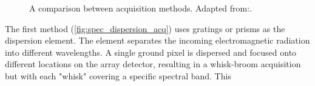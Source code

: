 \begin{figure}[htb!]
    \centering
    \captionsetup[subfigure]{width=0.45\textwidth}
    \caption{A comparison between acquisition methods. Adapted from:\cite{nieke1997a}.}\label{fig:spec_acquisition_compare}
\end{figure}

The first method (\ref{fig:spec_dispersion_acq}) uses gratings or prisms as the dispersion element. The element separates the incoming electromagnetic radiation into different wavelengths. A single ground pixel is dispersed and focused onto different locations on the array detector\cite{nieke1997a}, resulting in a whisk-broom acquisition but with each "whisk" covering a specific spectral band. This

